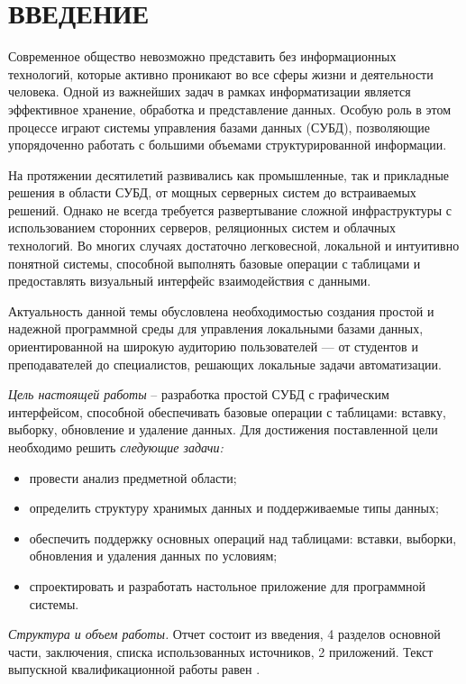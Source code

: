 \section*{ВВЕДЕНИЕ}

Современное общество невозможно представить без информационных технологий, которые активно проникают во все сферы жизни и деятельности человека. Одной из важнейших задач в рамках информатизации является эффективное хранение, обработка и представление данных. Особую роль в этом процессе играют системы управления базами данных (СУБД), позволяющие упорядоченно работать с большими объемами структурированной информации.

На протяжении десятилетий развивались как промышленные, так и прикладные решения в области СУБД, от мощных серверных систем до встраиваемых решений. Однако не всегда требуется развертывание сложной инфраструктуры с использованием сторонних серверов, реляционных систем и облачных технологий. Во многих случаях достаточно легковесной, локальной и интуитивно понятной системы, способной выполнять базовые операции с таблицами и предоставлять визуальный интерфейс взаимодействия с данными.

Актуальность данной темы обусловлена необходимостью создания простой и надежной программной среды для управления локальными базами данных, ориентированной на широкую аудиторию пользователей — от студентов и преподавателей до специалистов, решающих локальные задачи автоматизации.

\emph{Цель настоящей работы} – разработка простой СУБД с графическим интерфейсом, способной обеспечивать базовые операции с таблицами: вставку, выборку, обновление и удаление данных. Для достижения поставленной цели необходимо решить \emph{следующие задачи:}
\begin{itemize}
\item провести анализ предметной области;
\item определить структуру хранимых данных и поддерживаемые типы данных;
\item обеспечить поддержку основных операций над таблицами: вставки, выборки, обновления и удаления данных по условиям;
\item спроектировать и разработать настольное приложение для программной системы.
\end{itemize}

\emph{Структура и объем работы.} Отчет состоит из введения, 4 разделов основной части, заключения, списка использованных источников, 2 приложений. Текст выпускной квалификационной работы равен .

